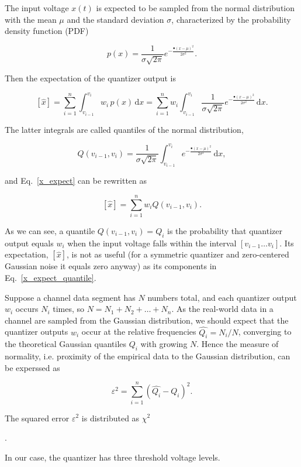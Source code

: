 \documentclass[letterpaper,twoside,12pt]{article}
\newcommand{\ud}{\mathrm d}
\begin{document}
The input voltage $x(t)$ is expected to be sampled from the normal distribution with the mean $\mu$ and the standard deviation $\sigma$, characterized by the probability density function (PDF) 

\begin{equation}
  \label{normal_pdf}
  p(x) =  \frac{1}{\sigma\sqrt{2\pi}} e^{-\frac{•(x-\mu)^2}{2\sigma^2}}.
\end{equation}

Then the expectation of the quantizer output is

\begin{equation}
  \label{x_expect}
  [\hat{x}] = \sum_{i=1}^n \int_{v_{i-1}}^{v_i} w_i \, p(x) \, \ud x =  
  \sum_{i=1}^n w_i \int_{v_{i-1}}^{v_i} \frac{1}{\sigma\sqrt{2\pi}} e^{-\frac{•(x-\mu)^2}{2\sigma^2}} \, \ud x.
\end{equation}

The latter integrals are called quantiles of the normal distribution,

\begin{equation}
  \label{quantile}
  Q(v_{i-1}, v_i) = \frac{1}{\sigma\sqrt{2\pi}} \int_{v_{i-1}}^{v_i} e^{-\frac{•(x-\mu)^2}{2\sigma^2}} \, \ud x,
\end{equation}

and Eq.~\eqref{x_expect} can be rewritten as

\begin{equation}
  \label{x_expect_quantile}
  [\hat{x}] = \sum_{i=1}^n { w_i Q(v_{i-1}, v_i)}.
\end{equation}

As we can see, a quantile $Q(v_{i-1}, v_i) = Q_i$ is the probability that quantizer output equals $w_i$ when the input voltage falls within the interval $[v_{i-1} \ldots {v_i}]$. Its expectation, $[\hat{x}]$, is not as useful (for a symmetric quantizer and zero-centered Gaussian noise it equals zero anyway) as its components in Eq.~\eqref{x_expect_quantile}.

Suppose a channel data segment has $N$ numbers total, and each quantizer output $w_i$ occurs $N_i$ times, so $N = N_1 + N_2 + \ldots + N_n$. As the real-world data in a channel are sampled from the Gaussian distribution, we should expect that the quantizer outputs $w_i$ occur at the relative frequencies $\hat{Q_i} = N_i / N$, converging to the theoretical Gaussian quantiles $Q_i$ with growing $N$. Hence the measure of normality, i.e. proximity of the empirical data to the Gaussian distribution, can be experssed as

\begin{equation}
  \label{q_err}
  \varepsilon^2 = \sum_{i=1}^n {(\hat{Q_i} - Q_i)^2}.
\end{equation}

The squared error $\varepsilon^2$ is distributed as $\chi^2$



















.\linebreak[4] \linebreak[4] \linebreak[4]


In our case, the quantizer has three threshold voltage levels.
\end{document}
